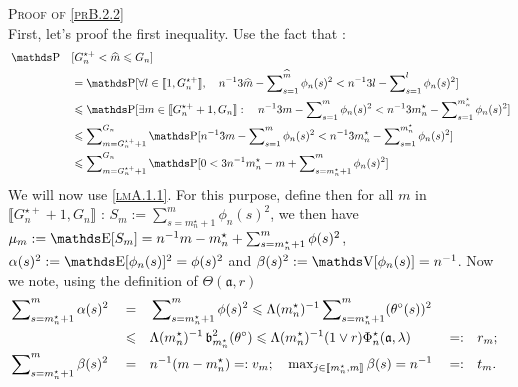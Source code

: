 \begin{pro}{\textsc{Proof of \textsc{\cref{prB.2.2}}} \\}
First, let's proof the first inequality.
Use the fact that : 
\begin{alignat*}{2}
& \P&&[G_{n}^{\star +} < \widehat{m} \leq G_{n}] \\
& &&= \P [\forall l \in \llbracket 1, G_{n}^{\star+}\rrbracket, \quad n^{-1} 3 \widehat{m} - \sum\nolimits_{s=1}^{\widehat{m}} \phi_{n}(s)^{2} < n^{-1} 3 l - \sum\nolimits_{s=1}^{l} \phi_{n}(s)^{2} ]\\
& && \leq \P[\exists m \in \llbracket G_{n}^{\star+} + 1, G_{n}\rrbracket : \quad n^{-1} 3 m - \sum\nolimits_{s=1}^{m} \phi_{n}(s)^{2} < n^{-1} 3 m_{n}^{\star} - \sum\nolimits_{s=1}^{m_{n}^{\star}} \phi_{n}(s)^{2} ]\\
& && \leq \sum\nolimits_{m = G_{n}^{\star+} + 1}^{G_{n}} \P[n^{-1} 3 m - \sum\nolimits_{s=1}^{m} \phi_{n}(s)^{2} < n^{-1} 3 m_{n}^{\star} - \sum\nolimits_{s=1}^{m_{n}^{\star}} \phi_{n}(s)^{2}]\\
& && \leq \sum\nolimits_{m = G_{n}^{\star+} + 1}^{G_{n}} \P[0 <  3 n^{-1} m_{n}^{\star} - m + \sum\nolimits_{s= m_{n}^{\star} + 1}^{m} \phi_{n}(s)^{2}]
\end{alignat*}
We will now use \textsc{\cref{lmA.1.1}}. For this purpose, define then for all $m$ in $\llbracket G_{n}^{\star+} + 1, G_{n} \rrbracket$ : $S_{m} := \sum\nolimits_{s= m_{n}^{\star} + 1}^{m} \phi_{n}(s)^{2}$, we then have $\mu_{m} := \E[S_{m}] = n^{-1} m- m_{n}^{\star} + \sum\nolimits_{s= m_{n}^{\star} + 1}^{m} \phi(s)^{2}$, $\alpha(s)^{2} := \E[\phi_{n}(s)]^{2} =  \phi(s)^{2}$ and $\beta(s)^{2} := \V[\phi_{n}(s)] = n^{-1}$.
Now we note, using the definition of $\Theta(\mathfrak{a}, r)$
\begin{alignat*}{5}
& \sum\nolimits_{s= m_{n}^{\star} + 1}^{m} \alpha(s)^{2} && = && \sum\nolimits_{s= m_{n}^{\star} + 1}^{m}\phi(s)^{2} \leqslant \Lambda(m_{n}^{\star})^{-1} \sum\nolimits_{s= m_{n}^{\star} + 1}^{m}(\theta^{\circ}(s))^{2}\\
& && \leqslant && \Lambda(m_{n}^{\star})^{-1} \operatorname{\mathfrak{b}}_{m_{n}^{\star}}^{2}(\theta^{\circ}) \leqslant \Lambda(m_{n}^{\star})^{-1} ( 1 \vee r) \Phi_{n}^{\star}(\mathfrak{a}, \lambda) && =: && r_{m};\\
& \sum\nolimits_{s= m_{n}^{\star} + 1}^{m} \beta(s)^{2} && = && n^{-1} (m - m_{n}^{\star}) =: v_{m}; \quad \max\nolimits_{j \in \llbracket m_{n}^{\star}, m \rrbracket} \beta(s) = n^{-1} && =: && t_{m}.
\end{alignat*}


\end{pro}
